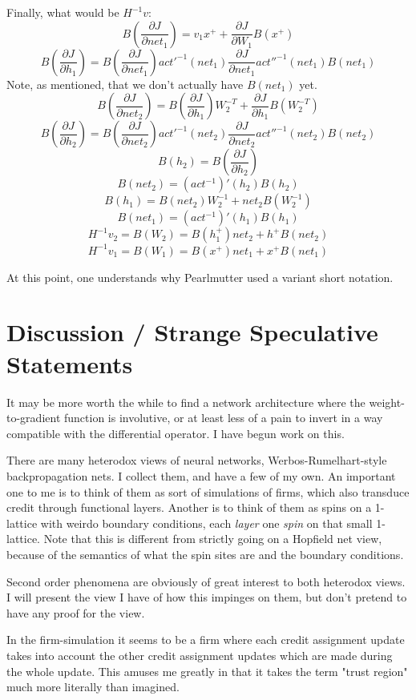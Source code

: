 \documentclass{article}
\begin{document}
Finally, what would be $H^{-1}v$:
$$ B(\frac{\partial J}{\partial net_1}) = v_1 x^+ + \frac{\partial J}{\partial W_1} B(x^+) $$
$$ B(\frac{\partial J}{\partial h_1}) = B(\frac{\partial J}{\partial net_1})act'^{-1}(net_1)
\frac{\partial J}{\partial net_1}act''^{-1}(net_1) B(net_1) $$
Note, as mentioned, that we don't actually have $B(net_1)$ yet.
$$ B(\frac{\partial J}{\partial net_2}) = B(\frac{\partial J}{\partial h_1}) W_2^{-T} + \frac{\partial J}{\partial h_1} B(W_2^{-T})$$
$$ B(\frac{\partial J}{\partial h_2}) = B(\frac{\partial J}{\partial net_2})act'^{-1}(net_2)
\frac{\partial J}{\partial net_2}act''^{-1}(net_2) B(net_2) $$
$$ B(h_2) = B(\frac{\partial J}{\partial h_2})$$
$$ B(net_2) = (act^{-1})'(h_2)B(h_2)$$
$$ B(h_1) = B(net_2) W_2^{-1} + net_2 B(W_2^{-1})$$
$$ B(net_1) = (act^{-1})'(h_1)B(h_1)$$
$$ H^{-1}v_2 = B(W_2) = B(h_1^+) net_2 + h^+ B(net_2)$$
$$ H^{-1}v_1 = B(W_1) = B(x^+) net_1 + x^+ B(net_1)$$

At this point, one understands why Pearlmutter used a variant short notation.

\section{Discussion / Strange Speculative Statements}

It may be more worth the while to find a network architecture where the weight-to-gradient function is involutive, or at least less of a pain to invert in a way compatible with the differential operator. I have begun work on this.

There are many heterodox views of neural networks, Werbos-Rumelhart-style backpropagation nets. I collect them, and have a few of my own. An important one to me is to think of them as sort of simulations of firms, which also transduce credit through functional layers. Another is to think of them as spins on a 1-lattice with weirdo boundary conditions, each \textit{layer} one \textit{spin} on that small 1-lattice. Note that this is different from strictly going on a Hopfield net view, because of the semantics of what the spin sites are and the boundary conditions.

Second order phenomena are obviously of great interest to both heterodox views. I will present the view I have of how this impinges on them, but don't pretend to have any proof for the view.

In the firm-simulation it seems to be a firm where each credit assignment update takes into account the other credit assignment updates which are made during the whole update. This amuses me greatly in that it takes the term "trust region" much more literally than imagined.
\end{document}
